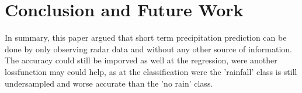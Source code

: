 \documentclass[oneside]{htwg-report}
\begin{document}
\section*{Conclusion and Future Work}
In summary, this paper argued that short term precipitation prediction can be done by only observing radar data and without any other source of information.
The accuracy could still be imporved as well at the regression, were another lossfunction may could help, as at the classification were the 'rainfall' class is still undersampled and worse accurate than the 'no rain' class.
\end{document}
